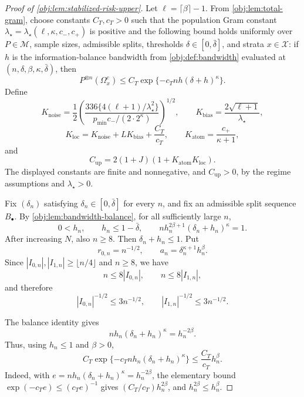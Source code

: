 \begin{proof}[Proof of \cref{obj:lem:stabilized-risk-upper}]
Let \(\ell=\lceil\beta\rceil-1\).  From \cref{obj:lem:total-gram}, choose constants \(C_T,c_T>0\) such that the population Gram constant
\(\lambda_\star=\lambda_\star(\ell,\kappa,c_-,c_+)\) is positive and the following bound holds uniformly over \(P\in\mathcal M\), sample sizes, admissible splits, thresholds \(\delta\in[0,\bar\delta]\), and strata \(x\in\mathcal X\): if \(h\) is the information-balance bandwidth from \cref{obj:def:bandwidth} evaluated at \((n,\delta,\beta,\kappa,\bar\delta)\), then
\[
P^{\otimes n}(\Omega_x^c)
\le
C_T\exp\{-c_T n h(\delta+h)^\kappa\}.
\]
Define
\[
K_{\mathrm{noise}}
=
\frac12
\left(
\frac{336\{4(\ell+1)/\lambda_\star^2\}}
{p_{\min}c_-/(2\cdot2^\kappa)}
\right)^{1/2},
\qquad
K_{\mathrm{bias}}=\frac{2\sqrt{\ell+1}}{\lambda_\star},
\]
\[
K_{\mathrm{loc}}
=
K_{\mathrm{noise}}+LK_{\mathrm{bias}}+\frac{C_T}{c_T},
\qquad
K_{\mathrm{atom}}=\frac{c_+}{\kappa+1},
\]
and
\[
C_{\mathrm{up}}
=
2(1+J)(1+K_{\mathrm{atom}}K_{\mathrm{loc}}).
\]
The displayed constants are finite and nonnegative, and \(C_{\mathrm{up}}>0\), by the regime assumptions and \(\lambda_\star>0\). %

Fix \((\delta_n)\) satisfying \(\delta_n\in[0,\bar\delta]\) for every \(n\), and fix an admissible split sequence \(B_\bullet\).  By \cref{obj:lem:bandwidth-balance}, for all sufficiently large \(n\),
\[
0<h_n,
\qquad
h_n\le 1-\bar\delta,
\qquad
n h_n^{2\beta+1}(\delta_n+h_n)^\kappa=1 .
\]
After increasing \(N\), also \(n\ge8\).  Then \(\delta_n+h_n\le1\).  Put
\[
r_{0,n}=n^{-1/2},
\qquad
a_n=\delta_n^{\kappa+1}h_n^\beta .
\]
Since \(|I_{0,n}|,|I_{1,n}|\ge\lfloor n/4\rfloor\) and \(n\ge8\), we have
\[
n\le8|I_{0,n}|,
\qquad
n\le8|I_{1,n}|,
\]
and therefore
\[
|I_{0,n}|^{-1/2}\le3n^{-1/2},
\qquad
|I_{1,n}|^{-1/2}\le3n^{-1/2}.
\]

The balance identity gives
\[
n h_n(\delta_n+h_n)^\kappa=h_n^{-2\beta}.
\]
Thus, using \(h_n\le1\) and \(\beta>0\),
\[
C_T\exp\{-c_T n h_n(\delta_n+h_n)^\kappa\}
\le
\frac{C_T}{c_T}h_n^\beta .
\]
Indeed, with \(e=n h_n(\delta_n+h_n)^\kappa=h_n^{-2\beta}\), the elementary bound
\(\exp(-c_Te)\le(c_Te)^{-1}\) gives \((C_T/c_T)h_n^{2\beta}\), and
\(h_n^{2\beta}\le h_n^\beta\). %


\end{proof}
